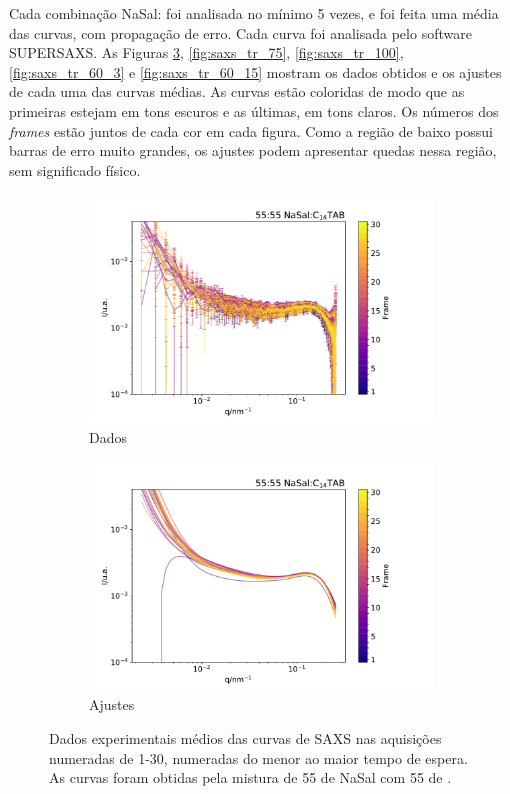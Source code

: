 	Cada combinação NaSal:\TTAB{} foi analisada no mínimo 5 vezes, e foi feita uma média das curvas, com propagação de erro. Cada curva foi analisada pelo software SUPERSAXS. As Figuras \ref{fig:saxs_tr_55}, \ref{fig:saxs_tr_75}, \ref{fig:saxs_tr_100}, \ref{fig:saxs_tr_60_3} e \ref{fig:saxs_tr_60_15} mostram os dados obtidos e os ajustes de cada uma das curvas médias. As curvas estão coloridas de modo que as primeiras estejam em tons escuros e as últimas, em tons claros. Os números dos \emph{frames} estão juntos de cada cor em cada figura. Como a região de baixo \q{} possui barras de erro muito grandes, os ajustes podem apresentar quedas nessa região, sem significado físico. 
	
	\begin{figure}[h]
		\begin{subfigure}[t]{0.5\textwidth}
			\centering
			\includegraphics[width=\textwidth]{imagens/saxs/TR_saxs_55_55_dados.pdf}
			\caption{Dados}
			\label{fig:saxs_tr_55_d}
		\end{subfigure}%
		\begin{subfigure}[t]{0.5\textwidth}
			\centering
			\includegraphics[width=\textwidth]{imagens/saxs/TR_saxs_55_55_ajuste.pdf}
			\caption{Ajustes}
			\label{fig:saxs_tr_55_a}
		\end{subfigure}
		\caption{Dados experimentais médios das curvas de SAXS nas aquisições numeradas de 1-30, numeradas do menor ao maior tempo de espera. As curvas foram obtidas pela mistura de 55 \mM{} de NaSal com 55\mM{} de \TTAB.}
		\label{fig:saxs_tr_55}
	\end{figure} 

